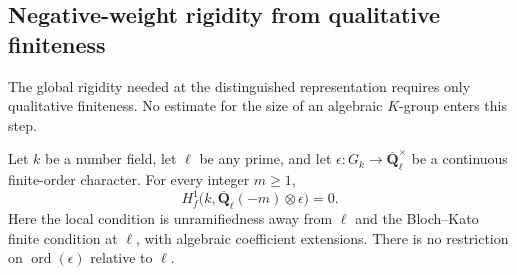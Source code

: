 \subsection{Negative-weight rigidity from qualitative finiteness}
\label{subsec:selmer-negative-weight-rigidity}

The global rigidity needed at the distinguished representation requires
only qualitative finiteness. No estimate for the size of an algebraic
\(K\)-group enters this step.

\begin{proposition}\label{prop:selmer-negative-weight-rigidity}
Let \(k\) be a number field, let \(\ell\) be any prime, and let
\(\epsilon:G_k\to\overline{\mathbf Q}_\ell^\times\) be a continuous
finite-order character. For every integer \(m\ge1\),
\[
 H_f^1\bigl(k,\overline{\mathbf Q}_\ell(-m)\otimes\epsilon\bigr)=0.
\]
Here the local condition is unramifiedness away from \(\ell\) and the
Bloch--Kato finite condition at \(\ell\), with algebraic coefficient
extensions. There is no restriction on
\(\operatorname{ord}(\epsilon)\) relative to \(\ell\).
\end{proposition}

